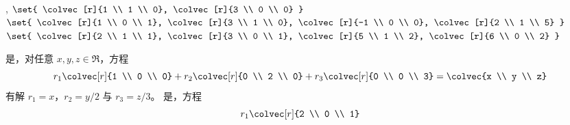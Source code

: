 \begin{exercises}
\begin{exparts*}
{               ,
                 } \)
      \partsitem \( \set{ \colvec[r]{1 \\ 1 \\ 0},
               \colvec[r]{3 \\ 0 \\ 0}  } \)
      \partsitem \( \set{ \colvec[r]{1 \\ 0 \\ 1},
               \colvec[r]{3 \\ 1 \\ 0},
               \colvec[r]{-1 \\ 0 \\ 0},
               \colvec[r]{2 \\ 1 \\ 5}  } \)
      \partsitem \( \set{ \colvec[r]{2 \\ 1 \\ 1},
               \colvec[r]{3 \\ 0 \\ 1},
               \colvec[r]{5 \\ 1 \\ 2},
               \colvec[r]{6 \\ 0 \\ 2}  } \)
    \end{exparts*}
    \begin{answer}
      \begin{exparts}
         \partsitem 是，对任意 \( x,y,z\in\Re \)，方程
          \begin{equation*}
             r_1\colvec[r]{1 \\ 0 \\ 0}
             +r_2\colvec[r]{0 \\ 2 \\ 0}
             +r_3\colvec[r]{0 \\ 0 \\ 3}
             =\colvec{x \\ y \\ z}
          \end{equation*}
          有解 \( r_1=x \)，\( r_2=y/2 \) 与
          \( r_3=z/3 \)。
        \partsitem 是，方程
          \begin{equation*}
            r_1\colvec[r]{2 \\ 0 \\ 1}

\end{equation*}
\end{exparts}
\end{answer}
\end{exercises}
